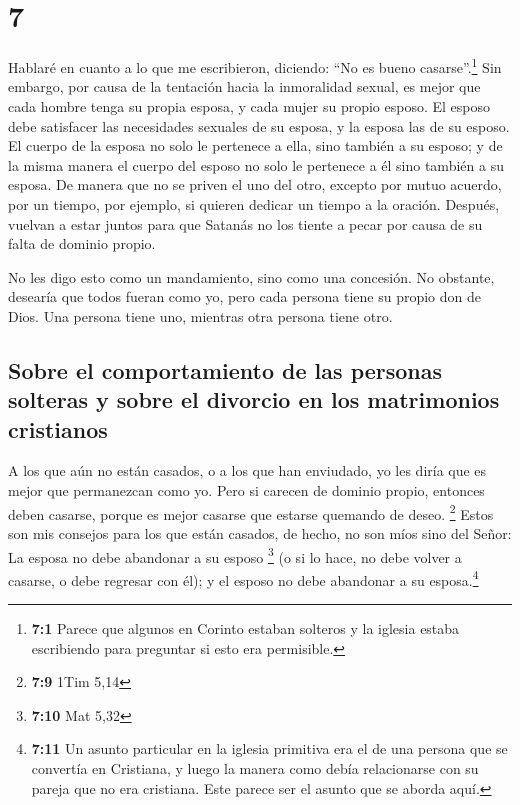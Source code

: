 \hypertarget{section-6}{%
\section{7}\label{section-6}}

 Hablaré en cuanto a lo que me escribieron, diciendo: ``No
es bueno casarse''.\footnote{\textbf{7:1} Parece que algunos en Corinto
  estaban solteros y la iglesia estaba escribiendo para preguntar si
  esto era permisible.}  Sin embargo, por causa de la
tentación hacia la inmoralidad sexual, es mejor que cada hombre tenga su
propia esposa, y cada mujer su propio esposo.  El esposo
debe satisfacer las necesidades sexuales de su esposa, y la esposa las
de su esposo.  El cuerpo de la esposa no solo le pertenece
a ella, sino también a su esposo; y de la misma manera el cuerpo del
esposo no solo le pertenece a él sino también a su esposa.
 De manera que no se priven el uno del otro, excepto por
mutuo acuerdo, por un tiempo, por ejemplo, si quieren dedicar un tiempo
a la oración. Después, vuelvan a estar juntos para que Satanás no los
tiente a pecar por causa de su falta de dominio propio.

 No les digo esto como un mandamiento, sino como una
concesión.  No obstante, desearía que todos fueran como
yo, pero cada persona tiene su propio don de Dios. Una persona tiene
uno, mientras otra persona tiene otro.

\hypertarget{sobre-el-comportamiento-de-las-personas-solteras-y-sobre-el-divorcio-en-los-matrimonios-cristianos}{%
\subsection{Sobre el comportamiento de las personas solteras y sobre el
divorcio en los matrimonios
cristianos}\label{sobre-el-comportamiento-de-las-personas-solteras-y-sobre-el-divorcio-en-los-matrimonios-cristianos}}

 A los que aún no están casados, o a los que han
enviudado, yo les diría que es mejor que permanezcan como yo.
 Pero si carecen de dominio propio, entonces deben
casarse, porque es mejor casarse que estarse quemando de deseo.
\footnote{\textbf{7:9} 1Tim 5,14}  Estos son mis consejos
para los que están casados, de hecho, no son míos sino del Señor: La
esposa no debe abandonar a su esposo \footnote{\textbf{7:10} Mat 5,32}
 (o si lo hace, no debe volver a casarse, o debe regresar
con él); y el esposo no debe abandonar a su esposa.\footnote{\textbf{7:11}
  Un asunto particular en la iglesia primitiva era el de una persona que
  se convertía en Cristiana, y luego la manera como debía relacionarse
  con su pareja que no era cristiana. Este parece ser el asunto que se
  aborda aquí.}

